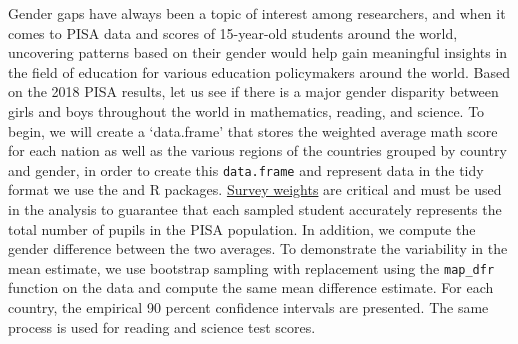 Gender gaps have always been a topic of interest among researchers, and
when it comes to PISA data and scores of 15-year-old students around the
world, uncovering patterns based on their gender would help gain
meaningful insights in the field of education for various education
policymakers around the world. Based on the 2018 PISA results, let us
see if there is a major gender disparity between girls and boys
throughout the world in mathematics, reading, and science. To begin, we
will create a `data.frame' that stores the weighted average math score
for each nation as well as the various regions of the countries grouped
by country and gender, in order to create this \texttt{data.frame} and
represent data in the tidy format we use the 
\citep{tidyverse} and  \citep{dplyr} R packages.
\href{https://www.oecd.org/pisa/data/2015-technical-report/PISA-2015-Technical-Report-Chapter-8-Survey-Weighting.pdf}{Survey
weights} are critical and must be used in the analysis to guarantee that
each sampled student accurately represents the total number of pupils in
the PISA population. In addition, we compute the gender difference
between the two averages. To demonstrate the variability in the mean
estimate, we use bootstrap sampling with replacement using the
\texttt{map\_dfr} function on the data and compute the same mean
difference estimate. For each country, the empirical 90 percent
confidence intervals are presented. The same process is used for reading
and science test scores.

